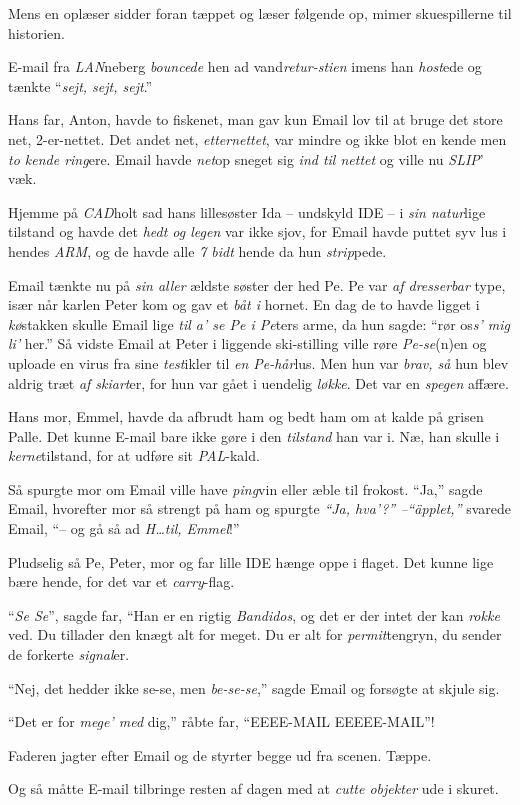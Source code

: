 \documentclass[danish]{article}
\begin{document}
\begin{sketch}
  \scene Mens en oplæser sidder foran tæppet og læser følgende op,
  mimer skuespillerne til historien.

 E-mail fra \emph{LAN}neberg \emph{bouncede} hen ad
vand\emph{retur-stien} imens han \emph{host}ede og tænkte
``\emph{sejt, sejt, sejt}.''

Hans far, Anton, 
havde to fiskenet, man gav kun Email lov til at bruge 
det store net, 2-er-nettet. Det andet net, \emph{etternettet}, var
mindre og ikke blot en kende men \emph{to kende ring}ere. Email havde
\emph{net}op sneget sig \emph{ind til nettet} og ville nu \emph{SLIP}' 
væk.

Hjemme på \emph{CAD}holt sad hans lillesøster Ida -- undskyld IDE -- i 
\emph{sin natur}lige tilstand og havde det \emph{hedt og legen} var
ikke sjov, for Email havde puttet syv lus i hendes \emph{ARM}, og de
havde alle \emph{7 bidt} hende da hun \emph{strip}pede.

Email tænkte nu på \emph{sin aller} ældste søster der hed Pe. Pe var
\emph{af dresserbar} type, især når karlen Peter kom og gav et
\emph{båt i} hornet. En dag de to havde ligget i \emph{kø}stakken
skulle Email lige \emph{til a' se Pe i Pe}ters arme, da hun sagde:
``rør os\emph{s' mig li'} her.'' Så vidste Email at Peter i liggende
ski-stilling ville røre \emph{Pe-se}(n)en og uploade en virus fra sine
\emph{test}ikler til
\emph{en Pe-hår}lus. Men hun var \emph{brav, så} hun blev aldrig træt
\emph{af skiart}er, for hun var gået i uendelig \emph{løkke}. Det var
en \emph{spegen} affære.

Hans mor, Emmel, havde da afbrudt ham og bedt ham om at kalde på
grisen Palle. Det kunne E-mail bare ikke gøre i den \emph{tilstand}
han var i.  Næ, han skulle i \emph{kerne}tilstand, for at udføre sit
\emph{PAL}-kald.

Så spurgte mor om Email ville have
\emph{ping}vin eller æble til frokost. ``Ja,'' sagde Email, hvorefter
mor så strengt på ham og spurgte \emph{``Ja, hva'?'' --``äpplet,''}
svarede Email, ``-- og gå så ad \emph{H\ldots til, Emmel}!''

Pludselig så Pe, Peter, mor og far lille IDE hænge oppe i
flaget. Det kunne lige bære hende, for det var et \emph{carry}-flag.

``\emph{Se Se}'', sagde far, ``Han er en rigtig \emph{Bandidos}, og
det er der intet der kan \emph{rokke} ved.  Du tillader den knægt alt
for meget.  Du er alt for \emph{permit}tengryn, du sender de forkerte
\emph{signal}er.
 
``Nej, det hedder ikke se-se, men \emph{be-se-se},'' sagde Email og
forsøgte at skjule sig.

``Det er for \emph{mege' med} dig,'' råbte far, ``EEEE-MAIL EEEEE-MAIL''!

\scene Faderen jagter efter Email og de styrter begge ud fra scenen. Tæppe.

Og så måtte E-mail tilbringe resten af dagen med at \emph{cutte objekter} ude i
skuret.

\end{sketch}
\end{document}
